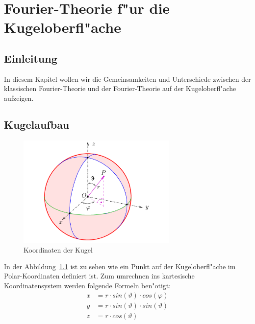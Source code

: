 \chapter{Fourier-Theorie f"ur die Kugeloberfl"ache\label{chapter:kugel}}
\begin{refsection}



\section{Einleitung}

In diesem Kapitel wollen wir die Gemeinsamkeiten und Unterschiede zwischen der klassischen Fourier-Theorie und der Fourier-Theorie auf der Kugeloberfl"ache aufzeigen.
 

\section{Kugelaufbau}

\begin{figure}%
\centering
\includegraphics[width=0.7\textwidth]{kugel/Kugelkoord.pdf}
\caption{Koordinaten der Kugel
\label{skript:Koordinaten der Kugel}}
\end{figure}

In der Abbildung~\ref{skript:Koordinaten der Kugel}   
ist zu sehen wie ein Punkt auf der Kugeloberfl"ache im Polar-Koordinaten definiert ist. Zum umrechnen ins kartesische Koordinatensystem werden folgende Formeln ben"otigt:
\begin{align*}
x& = r \cdot sin(\vartheta) \cdot cos(\varphi) 
\\
y& = r \cdot sin(\vartheta) \cdot sin(\vartheta)
\\
z& = r \cdot cos(\vartheta) 
\end{align*}
 

\end{refsection}
